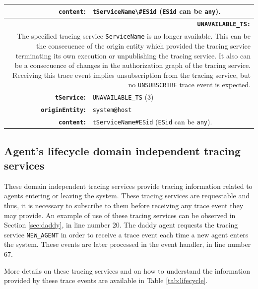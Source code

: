 \begin{table}[h!t]
{\begin{tabular}{|r|p{10cm}|}
			\textbf{\texttt{content}:} & \lstinline{tServiceName\#ESid} (\texttt{ESid} can be
						\texttt{any}).\\ \hline \hline
			\multicolumn{2}{|p{14cm}|}{\texttt{\textbf{UNAVAILABLE\_TS:}}}\\ \hline
			\multicolumn{2}{|p{14cm}|}{The specified tracing service
							\texttt{ServiceName} is no longer available. This can be the consecuence of
							the origin entity which provided the tracing service terminating its own
							execution or unpublishing the tracing service. It also can be a consecuence
							of changes in the authorization graph of the tracing service. Receiving this
							trace event implies unsubscription from the tracing service, but no
							\texttt{UNSUBSCRIBE} trace event is expected.}\\ \hline
           		\textbf{\texttt{tService}:} & \texttt{UNAVAILABLE\_TS} (3)\\ \hline
			\textbf{\texttt{originEntity}:} & \texttt{system@host}\\ \hline
			\textbf{\texttt{content}:} &  \texttt{tServiceName\#ESid} (\texttt{ESid} can be \texttt{any}).\\ \hline
       		\end{tabular}
       		}
   		\end{table}

		\subsection{Agent's lifecycle domain independent tracing services}

			These domain independent tracing services provide tracing information related to agents
			entering or leaving the system. These tracing services are requestable and thus, it is
			necessary to subscribe to them before receiving any trace event they may provide. An
			example of use of these tracing services can be observed in Section \ref{sec:daddy}, in line
			number 20. The daddy agent requests the tracing service \lstinline{NEW_AGENT} in order to
			receive a trace event each time a new agent enters the system. These events are later
			processed in the event handler, in line number 67.

			More details on these tracing services and on how to understand the information provided by
			these trace events are available in Table \ref{tab:lifecycle}.

